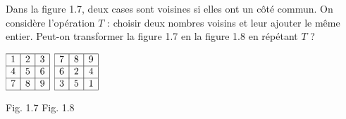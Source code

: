 Dans la figure 1.7, deux cases sont voisines si elles ont un côté commun. On considère l'opération $T$ : choisir deux nombres voisins et leur ajouter le même entier. Peut-on transformer la figure 1.7 en la figure 1.8 en répétant $T$ ?
\begin{center}
$\begin{array}{|c|c|c|}\hline 1 & 2 & 3\\\hline 4 & 5 & 6\\\hline 7 & 8 & 9\\\hline\end{array}$ \qquad
$\begin{array}{|c|c|c|}\hline 7 & 8 & 9\\\hline 6 & 2 & 4\\\hline 3 & 5 & 1\\\hline\end{array}$

Fig. 1.7 \qquad\qquad Fig. 1.8
\end{center}
